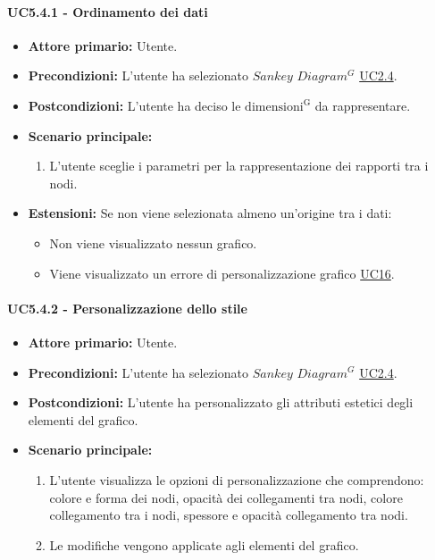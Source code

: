 \paragraph{UC5.4.1 - Ordinamento dei dati}
\label{sec:UC5.4.1}
    \begin{itemize}
        \item \textbf{Attore primario:} Utente.
        \item \textbf{Precondizioni:} L'utente ha selezionato $Sankey$ $Diagram^{G}$ \hyperref[sec:UC2.4]{UC2.4}.
	    \item \textbf{Postcondizioni:} L'utente ha deciso le ${\mathrm{dimensioni^{G}}}$ da rappresentare.
	    \item \textbf{Scenario principale:}
	    \begin{enumerate}
	    		\item L'utente sceglie i parametri per la rappresentazione dei rapporti tra i nodi.
		\end{enumerate}
	    \item \textbf{Estensioni:} Se non viene selezionata almeno un'origine tra i dati:
              \begin{itemize}
                  \item Non viene visualizzato nessun grafico.
                  \item Viene visualizzato un errore di personalizzazione grafico \hyperref[sec:UC16 - Errore di personalizzazione]{UC16}.
              \end{itemize}
    \end{itemize}
\paragraph{UC5.4.2 - Personalizzazione dello stile}
\label{sec:UC5.4.2}
\begin{itemize}
    \item \textbf{Attore primario:} Utente.
    \item \textbf{Precondizioni:} L'utente ha selezionato $Sankey$ $Diagram^{G}$ \hyperref[sec:UC2.4]{UC2.4}.
	\item \textbf{Postcondizioni:} L'utente ha personalizzato gli attributi estetici degli elementi del grafico.
	\item \textbf{Scenario principale:}
	\begin{enumerate}
		\item L'utente visualizza le opzioni di personalizzazione che comprendono:
        colore e forma dei nodi, opacità dei collegamenti tra nodi, colore collegamento tra i nodi, spessore e opacità collegamento tra nodi.
		\item Le modifiche vengono applicate agli elementi del grafico.
	\end{enumerate}
\end{itemize}

